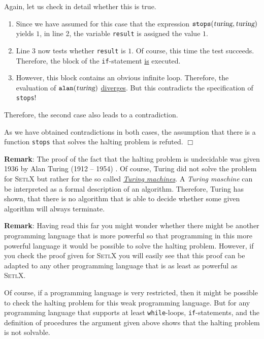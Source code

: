 \begin{enumerate}
      Again, let us check in detail whether this is true.  
      \begin{enumerate}
      \item Since we have assumed for this case that the expression 
            $\mathtt{stops}(\textsl{turing}, \textsl{turing})$ yields $1$, 
            in line 2, the variable \texttt{result} is assigned the value $1$. 
      \item Line 3 now tests whether \texttt{result} is $1$.  Of course,
            this time the test succeeds.  
            Therefore, the block of the \texttt{if}-statement \underline{is} executed.
      \item However, this block contains an obvious infinite loop.  Therefore, the
            evaluation of $\mathtt{alan}(\textsl{turing})$ \underline{diver}g\underline{es}.
            But this contradicts the specification of \texttt{stops}!
      \end{enumerate}   
      Therefore, the second case also leads to a contradiction.
\end{enumerate}
As we have obtained contradictions in both cases, the assumption that there is a function
\texttt{stops} that solves the halting problem is refuted.
\hspace*{\fill} $\Box$
\vspace*{0.3cm}

\noindent
\textbf{Remark}:
The proof of the fact that the halting problem is undecidable was given 1936 by Alan Turing (1912 -- 1954)
\cite{turing:36}.  Of course, Turing did not solve the problem for \textsc{SetlX} but rather
for the so called 
\href{http://en.wikipedia.org/wiki/Indirect_proof}{\emph{Turing machines}}.  
A \emph{Turing maschine} can be interpreted as a formal description of an algorithm.  
Therefore, Turing has shown, that there is no algorithm that is able to decide whether some given
algorithm will always terminate.
\vspace*{0.3cm}

\noindent
\textbf{Remark}:
Having read this far you might wonder whether there might be another programming language
that is more powerful so that programming in this more powerful language it would be possible to
solve the halting problem.  However, if you check the proof given for \textsc{SetlX} you will easily
see that this proof can be adapted to any other programming language that is as least as powerful as
\textsc{SetlX}. 

Of course, if a programming language is very restricted, then it might be possible to check the
halting problem for this weak programming language.  But for any programming language that supports
at least \texttt{while}-loops, \texttt{if}-statements, and the definition of procedures the argument
given above shows that the halting problem is not solvable.

